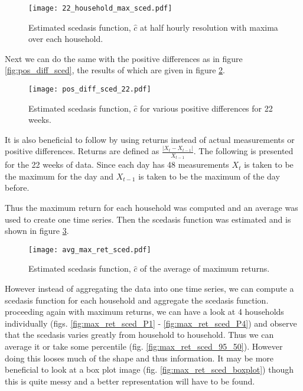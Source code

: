 \documentclass[a4paper]{article}
\begin{document}
\begin{figure}
\centering
\texttt{[image: 22\_household\_max\_sced.pdf]}
\caption{\label{fig:mysced_hh_max_22} Estimated scedasis function, $\hat{c}$ at half hourly resolution with maxima over each household.}
\end{figure}

Next we can do the same with the positive differences as in figure \ref{fig:pos_diff_sced}, the results of which are given in figure \ref{fig:pos_diff_sced_22}.

\begin{figure}
\centering
\texttt{[image: pos\_diff\_sced\_22.pdf]}
\caption{\label{fig:pos_diff_sced_22} Estimated scedasis function, $\hat{c}$ for various positive differences for 22 weeks.}
\end{figure}

It is also beneficial to follow \cite{einmahl16} by using returns instead of actual measurements or positive differences. Returns are defined as $\frac{\left|X_t - X_{t-1}\right|}{X_{t-1}}$.  The following is presented for the 22 weeks of data. Since each day has 48 measurements $X_t$ is taken to be the maximum for the day and $X_{t-1}$ is taken to be the maximum of the day before.

Thus the maximum return for each household was computed and an average was used to create one time series. Then the scedasis function was estimated and is shown in figure \ref{fig:avg_max_ret_sced}.

\begin{figure}
\centering
\texttt{[image: avg\_max\_ret\_sced.pdf]}
\caption{\label{fig:avg_max_ret_sced} Estimated scedasis function, $\hat{c}$ of the average of maximum returns.}
\end{figure}


However instead of aggregating the data into one time series, we can compute a scedasis function for each household and aggregate the scedasis function. proceeding again with maximum returns, we can have a look at 4 households individually (figs. \ref{fig:max_ret_sced_P1} - \ref{fig:max_ret_sced_P4}) and observe that the scedasis varies greatly from household to household. Thus we can average it or take some percentile (fig. \ref{fig:max_ret_sced_95_50}). However doing this looses much of the shape and thus information. It may be more beneficial to look at a box plot image (fig. \ref{fig:max_ret_sced_boxplot}) though this is quite messy and a better representation will have to be found.
\end{document}
